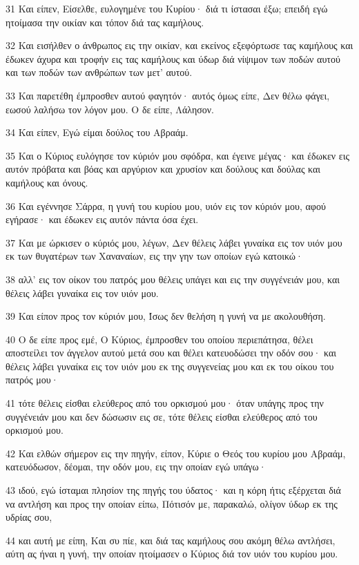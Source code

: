 \par 31 Και είπεν, Είσελθε, ευλογημένε του Κυρίου· διά τι ίστασαι έξω; επειδή εγώ ητοίμασα την οικίαν και τόπον διά τας καμήλους.
\par 32 Και εισήλθεν ο άνθρωπος εις την οικίαν, και εκείνος εξεφόρτωσε τας καμήλους και έδωκεν άχυρα και τροφήν εις τας καμήλους και ύδωρ διά νίψιμον των ποδών αυτού και των ποδών των ανθρώπων των μετ' αυτού.
\par 33 Και παρετέθη έμπροσθεν αυτού φαγητόν· αυτός όμως είπε, Δεν θέλω φάγει, εωσού λαλήσω τον λόγον μου. Ο δε είπε, Λάλησον.
\par 34 Και είπεν, Εγώ είμαι δούλος του Αβραάμ.
\par 35 Και ο Κύριος ευλόγησε τον κύριόν μου σφόδρα, και έγεινε μέγας· και έδωκεν εις αυτόν πρόβατα και βόας και αργύριον και χρυσίον και δούλους και δούλας και καμήλους και όνους.
\par 36 Και εγέννησε Σάρρα, η γυνή του κυρίου μου, υιόν εις τον κύριόν μου, αφού εγήρασε· και έδωκεν εις αυτόν πάντα όσα έχει.
\par 37 Και με ώρκισεν ο κύριός μου, λέγων, Δεν θέλεις λάβει γυναίκα εις τον υιόν μου εκ των θυγατέρων των Χαναναίων, εις την γην των οποίων εγώ κατοικώ·
\par 38 αλλ' εις τον οίκον του πατρός μου θέλεις υπάγει και εις την συγγένειάν μου, και θέλεις λάβει γυναίκα εις τον υιόν μου.
\par 39 Και είπον προς τον κύριόν μου, Ίσως δεν θελήση η γυνή να με ακολουθήση.
\par 40 Ο δε είπε προς εμέ, Ο Κύριος, έμπροσθεν του οποίου περιεπάτησα, θέλει αποστείλει τον άγγελον αυτού μετά σου και θέλει κατευοδώσει την οδόν σου· και θέλεις λάβει γυναίκα εις τον υιόν μου εκ της συγγενείας μου και εκ του οίκου του πατρός μου·
\par 41 τότε θέλεις είσθαι ελεύθερος από του ορκισμού μου· όταν υπάγης προς την συγγένειάν μου και δεν δώσωσιν εις σε, τότε θέλεις είσθαι ελεύθερος από του ορκισμού μου.
\par 42 Και ελθών σήμερον εις την πηγήν, είπον, Κύριε ο Θεός του κυρίου μου Αβραάμ, κατευόδωσον, δέομαι, την οδόν μου, εις την οποίαν εγώ υπάγω·
\par 43 ιδού, εγώ ίσταμαι πλησίον της πηγής του ύδατος· και η κόρη ήτις εξέρχεται διά να αντλήση και προς την οποίαν είπω, Πότισόν με, παρακαλώ, ολίγον ύδωρ εκ της υδρίας σου,
\par 44 και αυτή με είπη, Και συ πίε, και διά τας καμήλους σου ακόμη θέλω αντλήσει, αύτη ας ήναι η γυνή, την οποίαν ητοίμασεν ο Κύριος διά τον υιόν του κυρίου μου.
